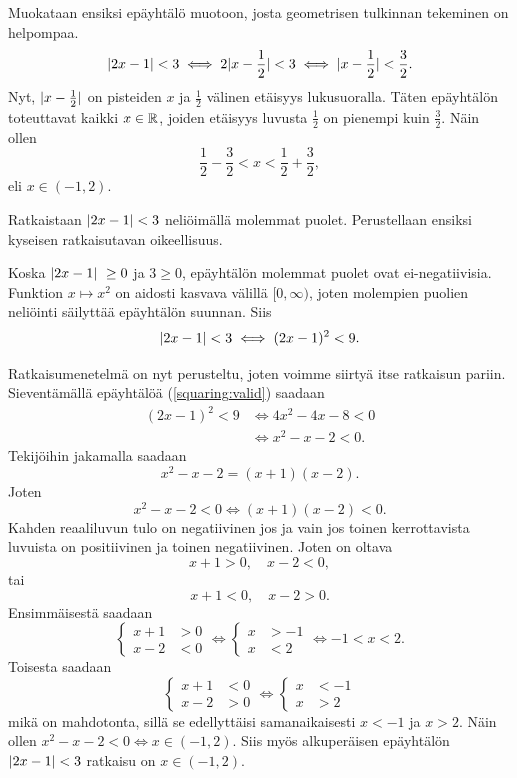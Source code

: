 \documentclass[12pt,a4paper]{article}
\begin{document}
\begin{solution}
Muokataan ensiksi epäyhtälö muotoon, josta geometrisen tulkinnan tekeminen
on helpompaa.
\[\lvert2x - 1\rvert < 3 \iff 2\lvert x - \frac{1}{2}\rvert < 3 \iff \lvert x -
\frac{1}{2}\rvert < \frac{3}{2}.\]
Nyt, \(\lvert x - \frac{1}{2}\rvert\) on pisteiden \(x\) ja \(\frac{1}{2}\) välinen
etäisyys lukusuoralla. Täten epäyhtälön toteuttavat kaikki \(x \in \mathbb{R}\), joiden
etäisyys luvusta \(\frac{1}{2}\) on pienempi kuin \(\frac{3}{2}\). Näin ollen
\[\frac{1}{2} - \frac{3}{2} < x < \frac{1}{2} + \frac{3}{2},\]
eli \(x \in (-1, 2)\).

Ratkaistaan \(\lvert2x - 1\rvert < 3\) neliöimällä molemmat puolet. Perustellaan
ensiksi kyseisen ratkaisutavan oikeellisuus.

Koska \(\lvert2x - 1\rvert\ \geq 0\) ja \(3 \geq 0\), epäyhtälön molemmat puolet
ovat ei-negatiivisia. Funktion \(x \mapsto x^2\) on aidosti kasvava välillä
\([0, \infty)\), joten molempien puolien neliöinti säilyttää epäyhtälön suunnan.
Siis
\begin{equation}\label{squaring:valid}
\lvert2x - 1\rvert < 3 \iff (2x - 1)^2 < 9.
\end{equation}

Ratkaisumenetelmä on nyt perusteltu, joten voimme siirtyä itse ratkaisun pariin.
Sieventämällä epäyhtälöä (\ref{squaring:valid}) saadaan
\begin{align*}
(2x - 1)^2 < 9 &\iff 4x^2 - 4x - 8 < 0 \\
&\iff x^2 - x - 2 < 0.
\end{align*}
Tekijöihin jakamalla saadaan
\[x^2 - x - 2 = (x + 1)(x - 2).\]
Joten
\[x^2 - x - 2 < 0 \iff (x + 1)(x - 2) < 0.\]
Kahden reaaliluvun tulo on negatiivinen jos ja vain jos toinen kerrottavista
luvuista on positiivinen ja toinen negatiivinen. Joten on oltava
\[x + 1 > 0, \quad x - 2 < 0,\]
tai
\[x + 1 < 0, \quad x - 2 > 0.\]
Ensimmäisestä saadaan
\begin{equation*}
\begin{cases}
  x + 1 &> 0 \\
  x - 2 &< 0
\end{cases}
\iff
\begin{cases}
  x &> -1 \\
  x &< 2
\end{cases}
\iff -1 < x < 2.
\end{equation*}
Toisesta saadaan
\begin{equation*}
\begin{cases}
  x + 1 &< 0 \\
  x - 2 &> 0
\end{cases}
\iff
\begin{cases}
  x &< -1 \\
  x &> 2
\end{cases}
\end{equation*}
mikä on mahdotonta, sillä se edellyttäisi samanaikaisesti
\(x < -1\) ja \(x > 2\). Näin ollen \(x^2 - x - 2 < 0 \iff x \in (-1, 2)\).
Siis myös alkuperäisen epäyhtälön \(\lvert2x - 1\rvert < 3\) ratkaisu on
\(x \in (-1, 2)\).
\end{solution}
\end{document}
